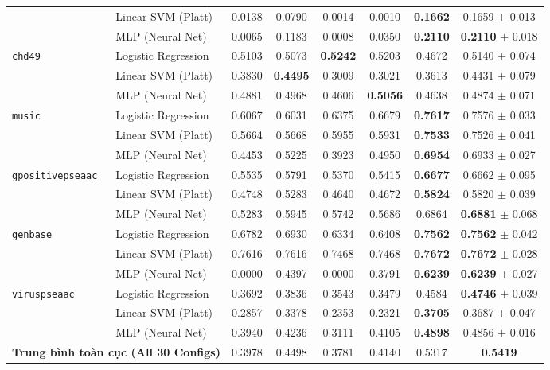 \documentclass[10pt,a4paper,twoside]{article}
\begin{document}
\begin{table}[H]
{\begin{tabular}{llcccccc}
 & Linear SVM (Platt) & 0.0138 & 0.0790 & 0.0014 & 0.0010 & \textbf{0.1662} & 0.1659 $\pm$ 0.013 \\
 & MLP (Neural Net) & 0.0065 & 0.1183 & 0.0008 & 0.0350 & \textbf{0.2110} & \textbf{0.2110} $\pm$ 0.018 \\
\midrule
\multirow{3}{*}{\texttt{chd49}} & Logistic Regression & 0.5103 & 0.5073 & \textbf{0.5242} & 0.5203 & 0.4672 & 0.5140 $\pm$ 0.074 \\
 & Linear SVM (Platt) & 0.3830 & \textbf{0.4495} & 0.3009 & 0.3021 & 0.3613 & 0.4431 $\pm$ 0.079 \\
 & MLP (Neural Net) & 0.4881 & 0.4968 & 0.4606 & \textbf{0.5056} & 0.4638 & 0.4874 $\pm$ 0.071 \\
\midrule
\multirow{3}{*}{\texttt{music}} & Logistic Regression & 0.6067 & 0.6031 & 0.6375 & 0.6679 & \textbf{0.7617} & 0.7576 $\pm$ 0.033 \\
 & Linear SVM (Platt) & 0.5664 & 0.5668 & 0.5955 & 0.5931 & \textbf{0.7533} & 0.7526 $\pm$ 0.041 \\
 & MLP (Neural Net) & 0.4453 & 0.5225 & 0.3923 & 0.4950 & \textbf{0.6954} & 0.6933 $\pm$ 0.027 \\
\midrule
\multirow{3}{*}{\texttt{gpositivepseaac}} & Logistic Regression & 0.5535 & 0.5791 & 0.5370 & 0.5415 & \textbf{0.6677} & 0.6662 $\pm$ 0.095 \\
 & Linear SVM (Platt) & 0.4748 & 0.5283 & 0.4640 & 0.4672 & \textbf{0.5824} & 0.5820 $\pm$ 0.039 \\
 & MLP (Neural Net) & 0.5283 & 0.5945 & 0.5742 & 0.5686 & 0.6864 & \textbf{0.6881} $\pm$ 0.068 \\
\midrule
\multirow{3}{*}{\texttt{genbase}} & Logistic Regression & 0.6782 & 0.6930 & 0.6334 & 0.6408 & \textbf{0.7562} & \textbf{0.7562} $\pm$ 0.042 \\
 & Linear SVM (Platt) & 0.7616 & 0.7616 & 0.7468 & 0.7468 & \textbf{0.7672} & \textbf{0.7672} $\pm$ 0.028 \\
 & MLP (Neural Net) & 0.0000 & 0.4397 & 0.0000 & 0.3791 & \textbf{0.6239} & \textbf{0.6239} $\pm$ 0.027 \\
\midrule
\multirow{3}{*}{\texttt{viruspseaac}} & Logistic Regression & 0.3692 & 0.3836 & 0.3543 & 0.3479 & 0.4584 & \textbf{0.4746} $\pm$ 0.039 \\
 & Linear SVM (Platt) & 0.2857 & 0.3378 & 0.2353 & 0.2321 & \textbf{0.3705} & 0.3687 $\pm$ 0.047 \\
 & MLP (Neural Net) & 0.3940 & 0.4236 & 0.3111 & 0.4105 & \textbf{0.4898} & 0.4856 $\pm$ 0.016 \\
\midrule
\multicolumn{2}{l}{\textbf{Trung bình toàn cục (All 30 Configs)}} & 0.3978 & 0.4498 & 0.3781 & 0.4140 & 0.5317 & \textbf{0.5419} \\
\bottomrule
\end{tabular}%
}
\end{table}
\clearpage
\end{document}
